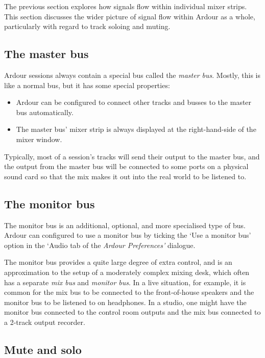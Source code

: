 \documentclass[10pt,a4paper]{book}
\begin{document}
{The previous section explores how signals flow within individual mixer
strips.  This section discusses the wider picture of signal flow
within Ardour as a whole, particularly with regard to track soloing and
muting.


\subsection{The master bus}

Ardour sessions always contain a special bus called the \emph{master
  bus}.  Mostly, this is like a normal bus, but it has some special properties:

\begin{itemize}
\item Ardour can be configured to connect other tracks
  and busses to the master bus automatically.
\item The master bus' mixer strip is always displayed at the
  right-hand-side of the mixer window.
\end{itemize}

Typically, most of a session's tracks will send their output to the
master bus, and the output from the master bus will be connected to
some ports on a physical sound card so that the mix makes it
out into the real world to be listened to.


\subsection{The monitor bus}

The monitor bus is an additional, optional, and more specialised type
of bus.  Ardour can configured to use a monitor bus by ticking the
`Use a monitor bus' option in the `Audio tab of the \emph{Ardour
  Preferences'} dialogue.


The monitor bus provides a quite large degree of extra control, and is
an approximation to the setup of a moderately complex mixing desk,
which often has a separate \emph{mix bus} and \emph{monitor bus}.  In
a live situation, for example, it is common for the mix bus to be
connected to the front-of-house speakers and the monitor bus to be
listened to on headphones.  In a studio, one might have the monitor
bus connected to the control room outputs and the mix bus connected to
a 2-track output recorder.


\subsection{Mute and solo}

}
\end{document}
